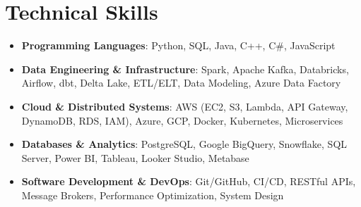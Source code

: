 \documentclass[letterpaper,11pt]{article}
\newcommand{\resumeSubHeadingListStart}{\begin{itemize}[leftmargin=0pt,label={},itemsep=-2pt]}
\newcommand{\resumeSubHeadingListEnd}{\end{itemize}}
\begin{document}
\section{Technical Skills}
 \resumeSubHeadingListStart
   \item{
       \textbf{Programming Languages}{: Python, SQL, Java, C++, C\#, JavaScript}
     }
     \item{
       \textbf{Data Engineering \& Infrastructure}{: Spark, Apache Kafka, Databricks, Airflow, dbt, Delta Lake, ETL/ELT, Data Modeling, Azure Data Factory}
     }
     \item{
       \textbf{Cloud \& Distributed Systems}{: AWS (EC2, S3, Lambda, API Gateway, DynamoDB, RDS, IAM), Azure, GCP, Docker, Kubernetes, Microservices}
     }
     \item{
       \textbf{Databases \& Analytics}{: PostgreSQL, Google BigQuery, Snowflake, SQL Server, Power BI, Tableau, Looker Studio, Metabase}
     }
     \item{
       \textbf{Software Development \& DevOps}{: Git/GitHub, CI/CD, RESTful APIs, Message Brokers, Performance Optimization, System Design}
     }
 \resumeSubHeadingListEnd

\end{document}
